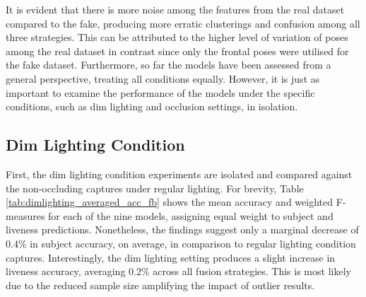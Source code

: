 \documentclass{mpaper}
\begin{document}
It is evident that there is more noise among the features from the real dataset compared to the fake, producing more erratic clusterings and confusion among all three strategies. This can be attributed to the higher level of variation of poses among the real dataset in contrast since only the frontal poses were utilised for the fake dataset. Furthermore, so far the models have been assessed from a general perspective, treating all conditions equally. However, it is just as important to examine the performance of the models under the specific conditions, such as dim lighting and occlusion settings, in isolation.


\subsection{Dim Lighting Condition}
First, the dim lighting condition experiments are isolated and compared against the non-occluding captures under regular lighting. For brevity, Table \ref{tab:dimlighting_averaged_acc_fb} shows the mean accuracy and weighted F-measures for each of the nine models, assigning equal weight to subject and liveness predictions. Nonetheless, the findings suggest only a marginal decrease of 0.4\% in subject accuracy, on average, in comparison to regular lighting condition captures. Interestingly, the dim lighting setting produces a slight increase in liveness accuracy, averaging 0.2\% across all fusion strategies. This is most likely due to the reduced sample size amplifying the impact of outlier results. 
\end{document}
